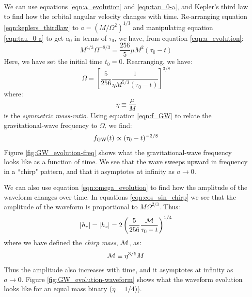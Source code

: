 We can use equations \ref{eqn:a_evolution} and \ref{eqn:tau_0-a}, and Kepler's third law to find how the orbital angular velocity changes with time. Re-arranging equation \ref{eqn:keplers_thirdlaw} to $a = (M/\Omega^2)^{1/3}$ and manipulating equation \ref{eqn:tau_0-a} to get $a_0$ in terms of $\tau_0$, we have, from equation \ref{eqn:a_evolution}:
\begin{equation*}
M^{4/3}\Omega^{-8/3} = \frac{256}{5} \mu M^2(\tau_0 - t)
\end{equation*}
Here, we have set the initial time $t_0 = 0$. Rearranging, we have:
\begin{equation}
\label{eqn:omega_evolution}
\Omega = \left[ \frac{5}{256} \frac{1}{\eta M^{5/3}(\tau_0 - t)} \right]^{3/8}
\end{equation}
where:
\begin{equation}
\label{eqn:symmetric_mass}
\eta \equiv \frac{\mu}{M}
\end{equation}
is the \emph{symmetric mass-ratio}. Using equation \ref{eqn:f_GW} to relate the gravitational-wave frequency to $\Omega$, we find:
\begin{equation}
\label{eqn:f_evolution}
\fGW(t) \propto (\tau_0 - t)^{-3/8}
\end{equation}
Figure \ref{fig:GW_evolution-freq} shows what the gravitational-wave frequency looks like as a function of time. We see that the wave sweeps upward in frequency in a ``chirp" pattern, and that it asymptotes at infinity as $a \rightarrow 0$.

We can also use equation \ref{eqn:omega_evolution} to find how the amplitude of the waveform changes over time. In equations \ref{eqn:cos_sin_chirp} we see that the amplitude of the waveform is proportional to $M\Omega^{2/3}$. Thus:
\begin{equation}
\label{eqn:amp_evolution}
|h_c| = |h_s| = 2 \left( \frac{5}{256} \frac{\mchirp}{\tau_0 - t} \right)^{1/4}
\end{equation}
where we have defined the \emph{chirp mass}, $\mathcal{M}$, as:
\begin{equation}
\mathcal{M} \equiv \eta^{3/5}M
\end{equation}
Thus the amplitude also increases with time, and it asymptotes at infinity as $a \rightarrow 0$. Figure \ref{fig:GW_evolution-waveform} shows what the waveform evolution looks like for an equal mass binary ($\eta=1/4)$).

